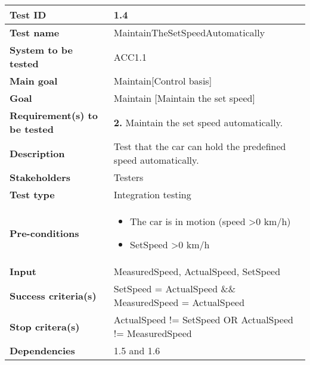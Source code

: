 	\begin{table}[H]
		\begin{tabular}{| p{4cm} | p{10cm} |}
		\hline
		\rowcolor{gray}
			\hline
			{\bf Test ID} & 1.4 \\ \hline
			{\bf Test name} & MaintainTheSetSpeedAutomatically\\ \hline
			{\bf System to be tested} & ACC1.1\\ \hline
			{\bf Main goal} & Maintain[Control basis] \\ \hline
			{\bf Goal} & Maintain [Maintain the set speed]\\ \hline
			{\bf Requirement(s) to be tested} & {\bf 2.} Maintain the set speed automatically.\\ \hline
			{\bf Description} & Test that the car can hold the predefined speed 
			automatically. \\ \hline
			{\bf Stakeholders} & Testers \\ \hline
			{\bf Test type} &  Integration testing\\ \hline
			{\bf Pre-conditions} & 
				\begin{itemize}
					\item The car is in motion (speed \textgreater  0 km/h)
					\item SetSpeed \textgreater 0 km/h
				\end{itemize}\\ \hline
			{\bf Input} & MeasuredSpeed, ActualSpeed, SetSpeed\\ \hline
			{\bf Success criteria(s)}& SetSpeed = ActualSpeed \&\& 
			MeasuredSpeed = ActualSpeed\\ \hline
			{\bf Stop critera(s)} &  ActualSpeed != SetSpeed OR
			ActualSpeed != MeasuredSpeed\\ \hline
			{\bf Dependencies} & 1.5 and 1.6 \\ \hline
		\end{tabular}
	\end{table}


